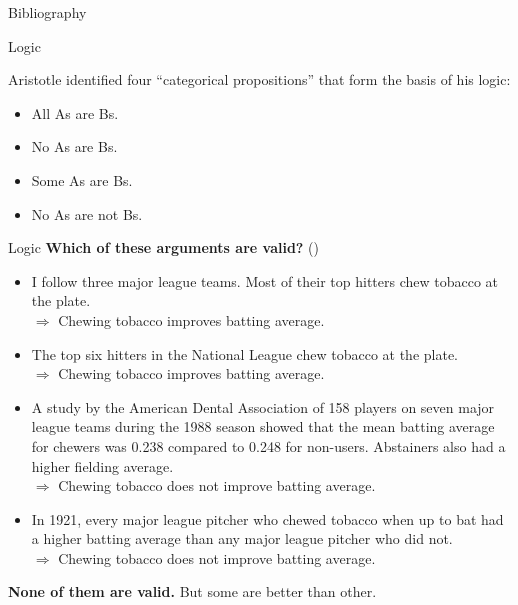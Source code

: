 \documentclass[8pt]{beamer}\usepackage[]{graphicx}\usepackage[]{color}
\begin{document}
\begin{frame}{Bibliography}
\printbibliography{}
\end{frame}


\begin{frame}{Logic}

Aristotle identified four ``categorical propositions'' that form the basis
of his logic:

%
\begin{itemize}
%
\item All As are Bs.
\item No As are Bs.
\item Some As are Bs.
\item No As are not Bs.
%
\end{itemize}
%
%
\end{frame}


\begin{frame}{Logic}
%
\textbf{Which of these arguments are valid?}
(\cite[Ch.1 Question 7]{hacking:2001:introduction})

%
\begin{itemize}
%
\item I follow three major league teams.  Most of their top hitters chew
tobacco at the plate.\\
$\Rightarrow$ Chewing tobacco improves batting average.
%
\item The top six hitters in the National League chew tobacco at the plate.\\
$\Rightarrow$ Chewing tobacco improves batting average.
%
\item A study by the American Dental Association of 158 players on
seven major league teams during the 1988 season showed that the mean batting
average for chewers was 0.238 compared to 0.248 for non-users.  Abstainers
also had a higher fielding average.\\
$\Rightarrow$ Chewing tobacco does not improve batting average.
%
\item In 1921, every major league pitcher who chewed tobacco when up to
bat had a higher batting average than any major league pitcher who did
not.\\
$\Rightarrow$ Chewing tobacco does not improve batting average.
%
\end{itemize}
%
\pause
\textbf{None of them are valid.}  But some are better than other.
%
\end{frame}
\end{document}
